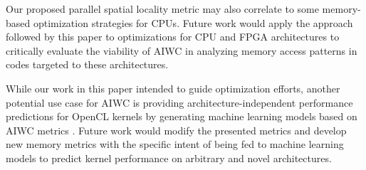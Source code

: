 \documentclass[review=false, sigchi]{acmart}
\begin{document}
	Our proposed parallel spatial locality metric may also correlate to some memory-based optimization strategies for CPUs. 
	Future work would apply the approach followed by this paper to optimizations for CPU and FPGA architectures to critically evaluate the viability of AIWC in analyzing memory access patterns in codes targeted to these architectures.
	
	While our work in this paper intended to guide optimization efforts, another potential use case for AIWC is providing architecture-independent performance predictions for OpenCL kernels by generating machine learning models based on AIWC metrics \cite{beauperformanceprediction}.  Future work would modify the presented metrics and develop new memory metrics with the specific intent of being fed to machine learning models to predict kernel performance on arbitrary and novel architectures. %
	
	
	
	
\end{document}
